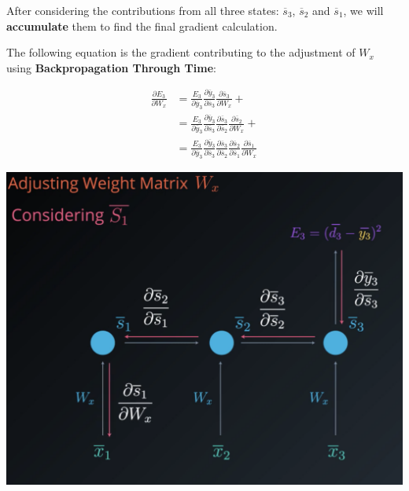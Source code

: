 After considering the contributions from all three states: \(\overline{s}_3\), \(\overline{s}_2\) and \(\overline{s}_1\), we will \textbf{accumulate} them to find the final gradient calculation. \newline

The following equation is the gradient contributing to the adjustment of \textbf{\(W_x\) }using \textbf{Backpropagation Through Time}:

\begin{equation}
    \begin{split}
        \frac{\partial E_3}{\partial W_x} & = \frac{E_3}{\partial \overline{y}_3} \frac{\partial \overline{y}_3}{\partial \overline{s}_3} \frac{\partial \overline{s}_3}{\partial W_x} + \\
        & = \frac{E_3}{\partial \overline{y}_3} \frac{\partial \overline{y}_3}{\partial \overline{s}_3} \frac{\partial \overline{s}_3}{\partial \overline{s}_2} \frac{\partial \overline{s}_2}{\partial W_x} + \\
        & = \frac{E_3}{\partial \overline{y}_3} \frac{\partial \overline{y}_3}{\partial \overline{s}_3} \frac{\partial \overline{s}_3}{\partial \overline{s}_2} \frac{\partial \overline{s}_2}{\partial \overline{s}_1} \frac{\partial \overline{s}_1}{\partial W_x}
    \end{split}
\end{equation}

\includegraphics[width=1\linewidth]{img//rnn//intro/image_backpropagation_t3.png}

